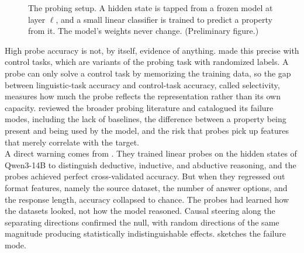 \begin{figure}[htbp]
\centering
{}
\caption{The probing setup. A hidden state is tapped from a frozen model at layer $\ell$, and a small linear classifier is trained to predict a property from it. The model's weights never change. (Preliminary figure.)}
\label{fig:probing}
\end{figure}


High probe accuracy is not, by itself, evidence of anything.
\textcite{hewitt2019control} made this precise with control tasks, which are variants of the probing task with randomized labels.
A probe can only solve a control task by memorizing the training data, so the gap between linguistic-task accuracy and control-task accuracy, called selectivity, measures how much the probe reflects the representation rather than its own capacity.
\textcite{belinkov2022probing} reviewed the broader probing literature and catalogued its failure modes, including the lack of baselines, the difference between a property being present and being used by the model, and the risk that probes pick up features that merely correlate with the target.
\\

A direct warning comes from \textcite{sahoo2026linear}.
They trained linear probes on the hidden states of Qwen3-14B to distinguish deductive, inductive, and abductive reasoning, and the probes achieved perfect cross-validated accuracy.
But when they regressed out format features, namely the source dataset, the number of answer options, and the response length, accuracy collapsed to chance.
The probes had learned how the datasets looked, not how the model reasoned.
Causal steering along the separating directions confirmed the null, with random directions of the same magnitude producing statistically indistinguishable effects.
 sketches the failure mode.

